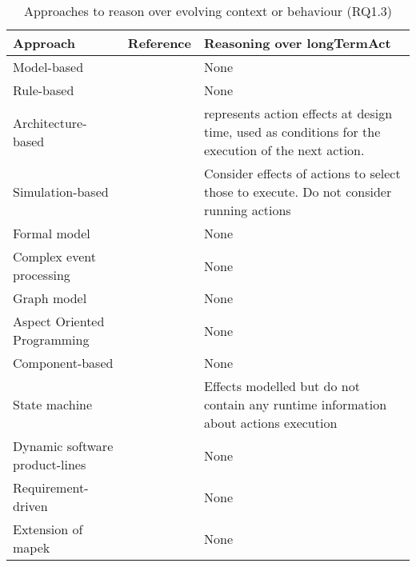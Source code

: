 \begin{table}
		\centering
    	\begin{tabular}{p{}p{}p{}}
    		\hline
    		\textbf{Approach} & \textbf{Reference} & Reasoning over \gls{longTermAct}\\
    		\hline
    		Model-based & \cite{DBLP:journals/computer/BlairBF09, DBLP:journals/computer/MorinBJFS09, DBLP:conf/seke/0001FNMKT14, DBLP:conf/models/0001FNMKBT14, DBLP:conf/icse/BarbosaLMJ17, DBLP:conf/icse/ChenPYNZ14} & None\\
    		Rule-based & \cite{DBLP:conf/icse/ArcainiRS15, DBLP:conf/icse/TaharaOH17, DBLP:conf/eurosys/GraceHPBCT08} & None \\
    		Architecture-based & \cite{DBLP:journals/jss/ChengG12, DBLP:journals/computer/GarlanCHSS04, DBLP:journals/computer/GeorgasHT09, DBLP:conf/cbse/FouquetMFBPJ12} & \cite{DBLP:journals/jss/ChengG12} represents action effects at design time, used as conditions for the execution of the next action.\\
    		Simulation-based & \cite{DBLP:conf/smartgridsec/0001FKNT14} & Consider effects of \glspl{action} to select those to execute. Do not consider running \glspl{action}\\
    		Formal model & \cite{DBLP:journals/taas/WeynsMA12, DBLP:conf/icse/IftikharW14a, DBLP:journals/taas/WeynsHH10, DBLP:conf/icse/BartelsK11} & None \\
    		Complex event processing &\cite{DBLP:conf/rr/AnicicFRSSS10} & None\\
    		Graph model & \cite{DBLP:conf/dbpl/MoffittS17, DBLP:journals/tse/KramerM90} & None \\
    		Aspect Oriented Programming  & \cite{DBLP:journals/taosd/GreenwoodB06, DBLP:conf/soco/DavidL06, DBLP:conf/icws/CharfiDM09, DBLP:journals/scp/ParraBCD11, DBLP:conf/ewsa/FalcarinA04, DBLP:conf/gpce/PintoFT03, DBLP:conf/icse/MorinBNJ09} & None \\
    		Component-based & \cite{DBLP:conf/soco/DavidL06} & None \\
    		State machine & \cite{DBLP:conf/sigsoft/MorenoCGS15, DBLP:conf/kbse/FilieriGLM11,DBLP:conf/wetice/DjoudiBZ14, DBLP:conf/aosd/ZhangGC09, DBLP:conf/icse/GhezziPST13, DBLP:conf/kbse/TajalliGEM10} & Effects modelled but do not contain any runtime information about \glspl{action} execution \\	
    		Dynamic software product-lines & \cite{DBLP:conf/dagstuhl/GhezziS10, DBLP:series/lncs/CordyCHLS13} & None \\
    		Requirement-driven & \cite{DBLP:conf/re/BaresiPS10} & None \\
    		Extension of \gls{mapek} & \cite{DBLP:conf/iscc/MaurerBEB11} & None \\
    		\hline
    	\end{tabular}
    	\caption{Approaches to reason over evolving context or \gls{behaviour} (RQ1.3)}
    	\label{table:sota:results:actions:rq1.3}
\end{table}

